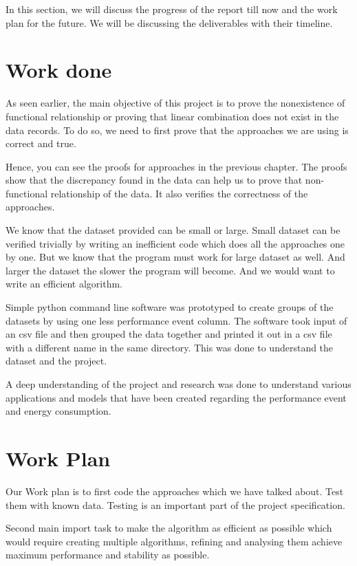 In this section, we will discuss the progress of the report till now and the work plan for the future. We will be discussing the deliverables with their timeline.

\section{Work done}
As seen earlier, the main objective of this project is to prove the nonexistence of functional relationship or proving that linear combination does not exist in the data records. To do so, we need to first prove that the approaches we are using is correct and true.

Hence, you can see the proofs for approaches in the previous chapter. The proofs show that the discrepancy found in the data can help us to prove that non-functional relationship of the data. It also verifies the correctness of the approaches.

We know that the dataset provided can be small or large. Small dataset can be verified trivially by writing an inefficient code which does all the approaches one by one. But we know that the program must work for large dataset as well. And larger the dataset the slower the program will become. And we would want to write an efficient algorithm.

Simple python command line software was prototyped to create groups of the datasets by using one less performance event column. The software took input of an csv file and then grouped the data together and printed it out in a csv file with a different name in the same directory. This was done to understand the dataset and the project.

A deep understanding of the project and research was done to understand various applications and models that have been created regarding the performance event and energy consumption.

\section{Work Plan}

Our Work plan is to first code the approaches which we have talked about. Test them with known data. Testing is an important part of the project specification.

Second main import task to make the algorithm as efficient as possible which would require creating multiple algorithms, refining and analysing them achieve maximum performance and stability as possible.

